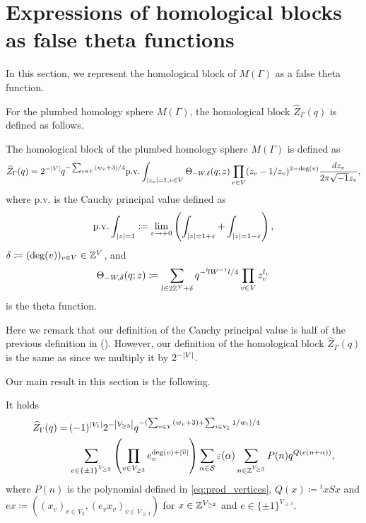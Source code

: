 \documentclass[11pt,a4paper,lualatex]{amsart}
\numberwithin{equation}{section} %
\begin{document}

\section{Expressions of homological blocks as false theta functions} \label{sec:HB_false}


In this section, we represent the homological block of $ M(\Gamma) $ as a false theta function.

For the plumbed homology sphere $ M(\Gamma) $, the homological block $ \widehat{Z}_{\Gamma} (q) $ is defined as follows.

\begin{dfn}
	The homological block of the plumbed homology sphere $ M(\Gamma) $ is defined as
	\[
	\widehat{Z}_{\Gamma} (q) 
	= 
	2^{-\left\lvert V\right\rvert} q^{-\sum_{v \in V} (w_{v} + 3)/4} 
	\mathrm{p.v.} \int_{\left\lvert z_{v}\right\rvert=1, v \in V} \Theta_{-W,\delta }(q; z)
	\prod_{v \in V} (z_{v} - 1/z_{v})^{2 - \deg(v)} \frac{dz_{v}}{2\pi\sqrt{-1}z_{v}},
	\]
	where $ \mathrm{p.v.} $ is the Cauchy principal value defined as
	\begin{align}
		\mathrm{p.v.} \int_{\abs{z} = 1}
		\coloneqq \lim_{\veps \to +0} \left( \int_{\abs{z} = 1+\veps} + \int_{\abs{z} = 1-\veps} \right),
	\end{align}
	$ \delta \coloneqq (\deg(v))_{v \in V} \in \Z^V $, and
	\[
	\Theta_{-W, \delta} (q; z) \coloneqq 
	\sum_{l \in 2\Z^V + \delta} q^{-{}^t\!l W^{-1} l/4} \prod_{v \in V} z_v^{l_v}
	\]
	is the theta function. 
\end{dfn}

Here we remark that our definition of the Cauchy principal value is half of the previous definition in \cite{GPPV} (\cite[p.55]{GPPV}).
However, our definition of the homological block $ \widehat{Z}_{\Gamma} (q) $ is the same as \cite{GPPV} since we multiply it by $ 2^{-\left\lvert V\right\rvert} $.

Our main result in this section is the following.

\begin{prop} \label{prop:HB_false}
	It holds
	\begin{align}
		\widehat{Z}_{\Gamma} (q) 
		= \,
		&(-1)^{\left\lvert V_1\right\rvert} 2^{-\left\lvert V_{\ge 3}\right\rvert} q^{-(\sum_{v \in V} (w_{v} + 3) + \sum_{i \in V_1} 1/w_i)/4} \\
		&\sum_{e \in \{ \pm 1 \}^{V_{\ge 3}}} \left( \prod_{v \in V_{\ge 3}} e_v^{\deg (v) + \left\lvert\overline{v}\right\rvert} \right)
		\sum_{\alpha \in \mathcal{S}} \varepsilon(\alpha)
		\sum_{n \in \mathbb{Z}^{V_{\ge 3}}} P(n) q^{Q(e(n + \alpha))},
	\end{align}
	where $ P(n) $ is the polynomial defined in \cref{eq:prod_vertices},
	$ Q(x) \coloneqq {}^t\!x S x $ and $ ex \coloneqq ((x_v)_{v \in V_{2}}, (e_v x_v)_{v \in V_{\ge 3}}) $ 
	for $ x \in \mathbb{Z}^{V_{\ge 2}} $ and $ e \in \{ \pm 1 \}^{V_{\ge 3}} $. 
\end{prop}
\end{document}
